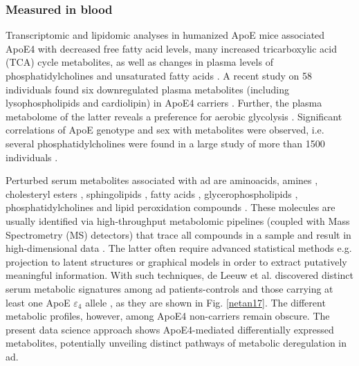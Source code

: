\documentclass{amsart}
\begin{document}
\subsubsection{Measured in blood}
Transcriptomic and lipidomic analyses in humanized ApoE mice associated ApoE4 with decreased free fatty acid levels, many increased  tricarboxylic acid (TCA) cycle metabolites, as well as changes in plasma levels of phosphatidylcholines and unsaturated fatty acids \cite{Area-Gomez2020APOE4Mice, Zhao2020AlzheimersPathways}. A recent study on 58 individuals found six downregulated plasma metabolites (including lysophospholipids and cardiolipin) in ApoE4 carriers \cite{pena-bautista2020MetabolomicsEffect}. Further, the plasma metabolome of the latter reveals a preference for aerobic glycolysis \cite{Farmer2021APO4Glycolysis}. Significant correlations of ApoE genotype and sex with metabolites were observed, i.e. several phosphatidylcholines were found in a large study of more than 1500 individuals \cite{Arnold2020SexMetabolome}.

Perturbed serum metabolites associated with \acrshort{ad} are aminoacids, amines \cite{deLeeuw2017Blood-basedDisease, Green2023InvestigatingDisease}, cholesteryl esters \cite{Proitsi2017AssociationAnalysis}, sphingolipids \cite{Varma2018BrainStudy,Sun2022AssociationDisease,Green2023InvestigatingDisease,Oeckl2019GlialImpairment,Barupal2019SetsPathophysiology}, fatty acids \cite{Fernandez-Calle2022APOEDiseases,deLeeuw2017Blood-basedDisease}, glycerophospholipids \cite{Varma2018BrainStudy, Jia2022ATypes,Huo2020BrainAnalysis, Weng2019TheImpairment}, phosphatidylcholines \cite{Simpson2016BloodAging} and lipid peroxidation compounds \cite{Fernandez-Calle2022APOEDiseases}. These molecules are usually identified via high-throughput metabolomic pipelines (coupled with Mass Spectrometry (MS) detectors) that trace all compounds in a sample and result in high-dimensional data \cite{Oka2023MultiomicsCohort}. The latter often require advanced statistical methods e.g. projection to latent structures \cite{Weng2019TheImpairment, Peeters2019StableData} or graphical models \cite{Peeters2022Rags2ridges:Matrices} in order to extract putatively meaningful information. 
With such techniques, de Leeuw et al. discovered distinct serum metabolic signatures among \acrshort{ad} patients-controls and those carrying at least one ApoE $\varepsilon_4$ allele \cite{deLeeuw2017Blood-basedDisease}, as they are shown in Fig. \ref{netan17}. The different metabolic profiles, however, among ApoE4 non-carriers remain obscure. The present data science approach shows ApoE4-mediated differentially expressed metabolites, potentially unveiling distinct pathways of metabolic deregulation in \acrshort{ad}.
\end{document}
